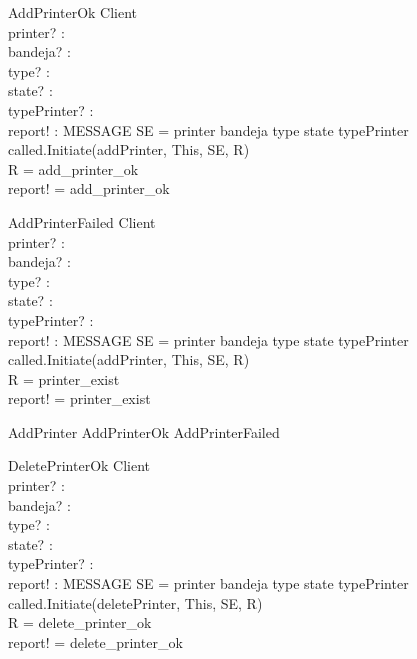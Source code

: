 \begin{schema}{AddPrinterOk}
\Xi Client \\
printer? : \nat \\
bandeja? : \nat \\
type? : \nat \\
state? : \nat \\
typePrinter? : \nat \\
report! : MESSAGE
\where
SE = \lseq printer bandeja type state typePrinter \rseq \\
called.Initiate(addPrinter, This, SE, R) \\
R = add\_printer\_ok \\
report! = add\_printer\_ok
\end{schema}

\begin{schema}{AddPrinterFailed}
\Xi Client \\
printer? : \nat \\
bandeja? : \nat \\
type? : \nat \\
state? : \nat \\
typePrinter? : \nat \\
report! : MESSAGE
\where
SE = \lseq printer bandeja type state typePrinter \rseq \\
called.Initiate(addPrinter, This, SE, R) \\
R = printer\_exist \\
report! = printer\_exist
\end{schema}

\begin{zed}
AddPrinter \sdef AddPrinterOk \lor AddPrinterFailed \end{zed}


\begin{schema}{DeletePrinterOk}
\Xi Client \\
printer? : \nat \\
bandeja? : \nat \\
type? : \nat \\
state? : \nat \\
typePrinter? : \nat \\
report! : MESSAGE
\where
SE = \lseq printer bandeja type state typePrinter \rseq \\
called.Initiate(deletePrinter, This, SE, R) \\
R = delete\_printer\_ok \\
report! = delete\_printer\_ok
\end{schema}

